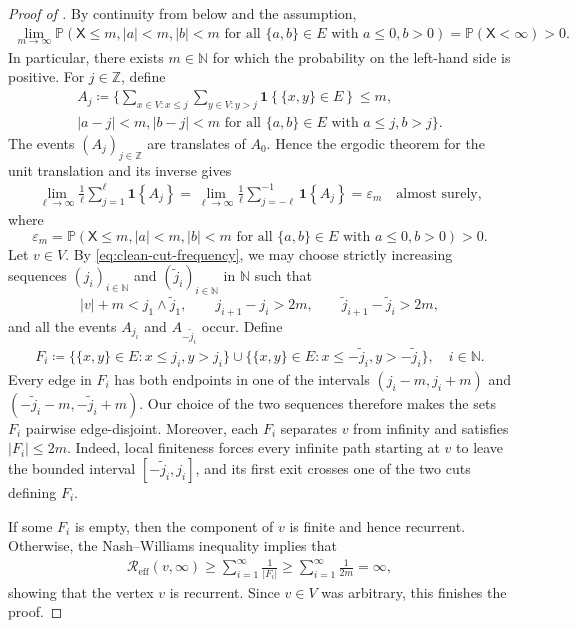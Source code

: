 \documentclass[11pt,a4paper]{scrartcl}
\renewcommand{\P}{\mathbb{P}}
\newcommand{\N}{\mathbb{N}}
\newcommand{\Z}{\mathbb{Z}}
\newcommand{\1}{\mathbb{1}}
\newcommand{\Reff}{\mathcal{R}_{\mathrm{eff}}}
\begin{document}
\begin{proof}[Proof of ]
By continuity from below and the assumption,
\begin{align*}
	\lim_{m \to \infty} \P(\mathsf X \leq m , |a|< m,|b| < m \text{ for all } \{a,b\} \in E \text{ with } a \leq 0, b > 0) = \P(\mathsf X< \infty) > 0.
\end{align*}
In particular, there exists $m \in \N$ for which the probability on the left-hand side is positive. For $j \in \Z$, define
\begin{multline*}
	A_j \coloneqq \Big\{ \sum_{x \in V : x \leq j} \sum_{y \in V : y > j} \mathbf{1}\left\{\{x,y\} \in E \right\} \leq m ,
	\\
	|a-j|< m, |b-j| < m \text{ for all } \{a,b\} \in E \text{ with } a \leq j, b > j \Big\}.
\end{multline*}
The events $(A_j)_{j\in\Z}$ are translates of $A_0$. Hence the ergodic theorem for the unit translation and its inverse gives
\begin{align}\label{eq:clean-cut-frequency}
	\lim_{\ell \to \infty} \frac{1}{\ell} \sum_{j=1}^{\ell} \mathbf{1}\left\{A_j\right\}
	= \lim_{\ell \to \infty} \frac{1}{\ell} \sum_{j=-\ell}^{-1} \mathbf{1}\left\{A_j\right\}
	= \varepsilon_m \quad \text{almost surely},
\end{align}
where
\[
\varepsilon_m = \P(\mathsf X \leq m , |a|< m,|b| < m \text{ for all } \{a,b\} \in E \text{ with } a \leq 0, b > 0) > 0.
\]
Let $v\in V$. By \eqref{eq:clean-cut-frequency}, we may choose strictly increasing sequences $(j_i)_{i\in \N}$ and $(\tilde{j}_i)_{i\in \N}$ in $\N$ such that
\[
|v|+m<j_1\wedge\tilde{j}_1,
\qquad j_{i+1}-j_i>2m,
\qquad \tilde{j}_{i+1}-\tilde{j}_i>2m,
\]
and all the events $A_{j_i}$ and $A_{-\tilde{j}_i}$ occur. Define
\begin{align*}
	F_i \coloneqq \Big\{ \{x,y\} \in E : x \leq j_i, y > j_i \Big\}
	\cup \Big\{ \{x,y\} \in E : x \leq -\tilde{j}_i, y > -\tilde{j}_i\Big\}, \quad i \in \N.
\end{align*}
Every edge in $F_i$ has both endpoints in one of the intervals $(j_i-m,j_i+m)$ and $(-\tilde{j}_i-m,-\tilde{j}_i+m)$. Our choice of the two sequences therefore makes the sets $F_i$ pairwise edge-disjoint. Moreover, each $F_i$ separates $v$ from infinity and satisfies $|F_i|\leq 2m$. Indeed, local finiteness forces every infinite path starting at $v$ to leave the bounded interval $[-\tilde{j}_i,j_i]$, and its first exit crosses one of the two cuts defining $F_i$.

If some $F_i$ is empty, then the component of $v$ is finite and hence recurrent. Otherwise, the Nash--Williams inequality implies that
\begin{align*}
	\Reff(v,\infty) \geq \sum_{i=1}^{\infty} \frac{1}{|F_i|}
	\geq \sum_{i=1}^{\infty} \frac{1}{2m} = \infty,
\end{align*}
showing that the vertex $v$ is recurrent. Since $v\in V$ was arbitrary, this finishes the proof.
\end{proof}
\end{document}
